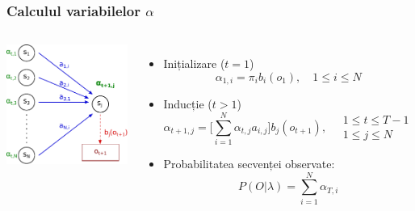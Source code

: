 \begin{frame}
  \frametitle{Calculul variabilelor $\alpha$}
  \begin{columns}
    \includegraphics[width=\textwidth]{graphics/forward-backward/general/forward.pdf}
    \begin{itemize}
    \item Inițializare ($t = 1$)%
      \begin{equation*}
        \alpha_{1,i}=\pi_ib_i(o_1), \quad 1 \le i \le N
      \end{equation*}\pause%
    \item Inducție ($t>1$)%
      \begin{equation*}
        \label{eq:alpha_induct}
        \alpha_{t+1,j}=\Big[
        \displaystyle\sum_{i=1}^{N}\alpha_{t,j}a_{i,j}\Big]
        b_{j}(o_{t+1}), \quad \substack{1 \le t \le T-1\\1\le j \le N}
      \end{equation*}\pause%
    \item Probabilitatea secvenței observate:
      \begin{equation*}
        \label{eq:alpha_term}
        P(O \vert \lambda) =
        \displaystyle\sum_{i=1}^{N}\alpha_{T,i}
      \end{equation*}
    \end{itemize}
  \end{columns}
\end{frame}

